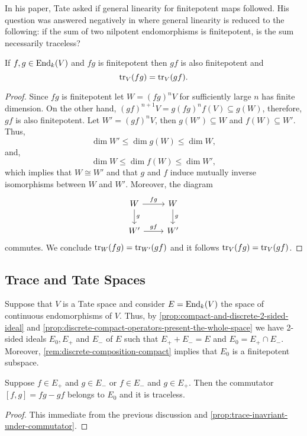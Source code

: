\begin{remark}\label{rem:general-linearity-trace}
	In his paper, Tate asked if general linearity for finitepotent maps followed. His question was answered negatively in \cite{TATE-TRACE-COUNTER-EXAMPLE} where general linearity is reduced to the following: if the sum of two nilpotent endomorphisms is finitepotent, is the sum necessarily traceless?  
\end{remark}
\begin{proposition}\label{prop:trace-inavriant-under-commutator}
	If $f,g \in \operatorname{End}_{k}(V)$ and $fg$ is finitepotent then $gf$ is also finitepotent and 
	\[
		\operatorname{tr}_{V}(fg) = \operatorname{tr}_{V}(gf).
	\]
\end{proposition}
\begin{proof}
	Since $fg$ is finitepotent let $W =(fg)^{n}V$ for sufficiently large $n$ has finite dimension. On the other hand, $(gf)^{n+1}V= g(fg)^{n}f(V) \subseteq g(W)$, therefore, $gf$ is also finitepotent. Let $W' = (gf)^{n}V$, then $g(W') \subseteq W$ and $f(W) \subseteq W'$. Thus, 
	\[
		\dim W' \leq \dim g(W) \leq \dim W,
	\]
	and, 
	\[
		\dim W \leq \dim f(W) \leq \dim W',
	\]
	which implies that $W\cong W'$ and that $g$ and $f$ induce mutually inverse isomorphisms between $W$ and $W'$. Moreover, the diagram
	\[
		\begin{tikzcd}
			W \arrow[r, "fg"]\arrow[d, "g"] & W \arrow[d, "g"] \\
			W' \arrow[r, "gf"] & W'
		\end{tikzcd}
	\]
	commutes. We conclude $\operatorname{tr}_{W}(fg) = \operatorname{tr}_{W'}(gf)$ and it follows $\operatorname{tr}_{V}(fg) = \operatorname{tr}_{V}(gf)$.
\end{proof}
\subsection*{Trace and Tate Spaces}\label{Tate-and-trace}
Suppose that $V$ is a Tate space and consider $E = \operatorname{End}_{k}(V)$ the space of continuous endomorphisms of $V$. Thus, by \cref{prop:compact-and-discrete-2-sided-ideal} and \cref{prop:discrete-compact-operators-present-the-whole-space} we have 2-sided ideals $E_{0}, E_{+}$ and $E_{-}$ of $E$ such that $E_{+} + E_{-} = E$ and $E_{0} = E_{+} \cap E_{-}$. Moreover, \cref{rem:discrete-composition-compact} implies that $E_{0}$ is a finitepotent subspace.
\begin{lemma}\label{lemm:traceless-commutator}
	Suppose $f \in E_{+}$ and $g \in E_{-}$ or $f \in E_{-}$ and $g\in E_{+}$. Then the commutator $[f,g] = fg - gf$ belongs to $E_{0}$ and it is traceless.
\end{lemma}
\begin{proof}
	This immediate from the previous discussion and \cref{prop:trace-inavriant-under-commutator}.
\end{proof}

